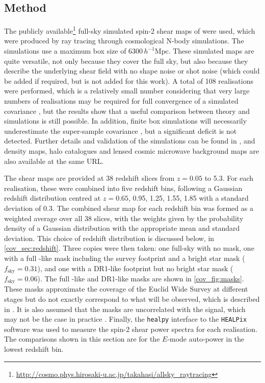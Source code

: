 \subsection{Method}

The publicly available\footnote{\url{http://cosmo.phys.hirosaki-u.ac.jp/takahasi/allsky_raytracing}} full-sky simulated spin-2 shear maps of \citet{Takahashi2017} were used, which were produced by ray tracing through cosmological N-body simulations. The simulations use a maximum box size of $6300 \, h^{-1} \text{Mpc}$. These simulated maps are quite versatile, not only because they cover the full sky, but also because they describe the underlying shear field with no shape noise or shot noise (which could be added if required, but is not added for this work). A total of 108 realisations were performed, which is a relatively small number considering that very large numbers of realisations may be required for full convergence of a simulated covariance \citep{Blot2016}, but the results show that a useful comparison between theory and simulations is still possible. In addition, finite box simulations will necessarily underestimate the super-sample covariance \citep{Hamilton2006, Li2014}, but a significant deficit is not detected. Further details and validation of the simulations can be found in \citet{Takahashi2017}, and density maps, halo catalogues and lensed cosmic microwave background maps are also available at the same URL.

The shear maps are provided at 38 redshift slices from $z = 0.05$ to 5.3.
For each realisation, these were combined into five redshift bins, following a Gaussian redshift distribution centred at $z = 0.65$, 0.95, 1.25, 1.55, 1.85 with a standard deviation of 0.3.
The combined shear map for each redshift bin was formed as a weighted average over all 38 slices, with the weights given by the probability density of a Gaussian distribution with the appropriate mean and standard deviation. This choice of redshift distribution is discussed below, in \autoref{cov_sec:redshift}.
Three copies were then taken: one full-sky with no mask, one with a full \Euclid{}-like mask including the survey footprint and a bright star mask ($f_\text{sky} = 0.31$), and one with a \Euclid{} DR1-like footprint but no bright star mask ($f_\text{sky} = 0.06$). The full \Euclid{}-like and \Euclid{} DR1-like masks are shown in \autoref{cov_fig:masks}. These masks approximate the coverage of the Euclid Wide Survey at different stages but do not exactly correspond to what will be observed, which is described in \citet{Scaramella2021}. It is also assumed that the masks are uncorrelated with the signal, which may not be the case in practice \citep[e.g.][]{Fabbian2021}. Finally, the \texttt{healpy} \citep{Zonca2019} interface to the \texttt{HEALPix} \citep{Gorski2005} software was used to measure the spin-2 shear power spectra for each realisation. The comparisons shown in this section are for the $E$-mode auto-power in the lowest redshift bin.

